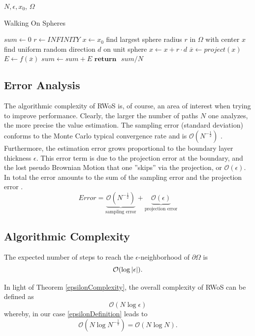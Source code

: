  \begin{algorithm}[H]{$N, \epsilon, x_{0}$, $\Omega$}
  \caption{Walking On Spheres}
 \label{alg:wos}
\begin{algorithmic}[1]
   \State $sum \gets 0$
   \label{lst:line:for}
   \State $ r \gets INFINITY$
   \State $x \leftarrow x_{0}$
      \State find largest sphere radius $r$ in $\Omega$ with center $x$ \label{lst:line:radius}
      \State find uniform random direction $d$ on unit sphere \label{lst:line:direction}
      \State $ x \gets x + r\cdot d$ 
 \EndWhile
 \State $\overline x \gets project(x)$ 
 \State $E \gets f(\overline x)$ 
 \State $sum \gets sum + E$  \label{lst:line:reduce}
  \EndFor
 \State $\textbf{return} \text{ } sum / N$ 

\end{algorithmic}
\end{algorithm}

\subsection{Error Analysis}\label{errorAnal}
The algorithmic complexity of \Gls{RWoS} is, of course, an area of interest
when trying to improve performance. Clearly, the larger the number of paths $N$ one
analyzes, the more precise the value estimation. The sampling error (standard deviation)
conforms to the Monte Carlo typical convergence rate and
is $\mathcal{O}(N^{-\frac{1}{2}})$ \cite{Bornemann}. Furthermore, the estimation error grows proportional to
the boundary layer thickness $\epsilon$.
This error term is due to the projection error at the boundary, and the lost
pseudo Brownian Motion that one ''skips'' via the projection, or  $\mathcal{O}(\epsilon)$.
In total the error amounts to the sum of the sampling error and the projection error \cite{Bornemann}.
\begin{equation}
  Error = \underbrace{ \mathcal{O}(N^{-\frac{1}{2}})}_\text{sampling error} + \underbrace{\mathcal{O}(\epsilon)}_\text{projection error}
  \label{errorComplexity}
\end{equation}

\subsection{Algorithmic Complexity}
\begin{theorem}
The expected number of steps to reach the $\epsilon$-neighborhood of $\partial\Omega$
is \begin{equation}
\mathcal{O}(\log{}\abs{\epsilon}).
 \end{equation}
 \label{epsilonComplexity}
\end{theorem}
In light of Theorem \ref{epsilonComplexity}, the overall complexity of \Gls{RWoS} can be
defined as $$\mathcal{O}(N \log{}\epsilon)$$ whereby, in our case \ref{epsilonDefinition}
 leads to $$\mathcal{O}(N \log{N^{-\frac{1}{2}}}) = \mathcal{O}(N \log{N}).$$

